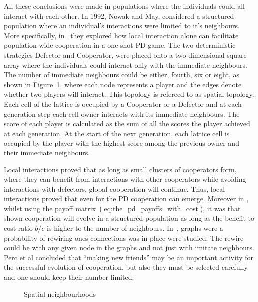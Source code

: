 \documentclass{article}
\theoremstyle{definition}
\begin{document}
All these conclusions were made in populations where the individuals could all
interact with each other. In 1992, Nowak and May, considered a structured population
where an individual's interactions were limited to it's neighbours.
More specifically, in~\cite{Nowak1992b} they explored how local interaction
alone can facilitate population wide cooperation in a one shot PD game. The two
deterministic strategies Defector and Cooperator, were placed onto a two
dimensional square array where the individuals could interact only with the
immediate neighbours. The number of immediate neighbours could be either,
fourth, six or eight, as shown in Figure~\ref{fig:topologies}, where each node
represents a player and the edges denote whether two players will interact. This
topology is refereed to as spatial topology. Each cell of the lattice is
occupied by a Cooperator or a Defector and at each generation step each cell owner
interacts with its immediate neighbours. The score of each player is calculated
as the sum of all the scores the player achieved at each generation. At the
start of the next generation, each lattice cell is occupied by the player with
the highest score among the previous owner and their immediate neighbours.

Local interactions proved that as long as small clusters of cooperators form, where
they can benefit from interactions with other cooperators while avoiding
interactions with defectors, global cooperation will continue. Thus, local
interactions proved that even for the PD cooperation can emerge. Moreover in
\cite{Ohtsuki2006}, whilst using the payoff
matrix~(\ref{eq:the_pd_payoffs_with_cost}), it was that shown cooperation will
evolve in a structured population as long as the benefit to cost ratio \(b / c\)
is higher to the number of neighbours. In~\cite{Perc2011}, graphs were a probability
of rewiring ones connections was in place were studied. The rewire could be with any
given node in the graphs and not just with imitate neighbours. Perc et al
concluded that ``making new friends'' may be an important activity for the
successful evolution of cooperation, but also they must be selected
carefully and one should keep their number limited.

\begin{figure}[!hbtp]
\centering
    \begin{subfigure}{.25\textwidth}
        
    \end{subfigure}
    \begin{subfigure}{.25\textwidth}\centering
        
     \end{subfigure}
     \begin{subfigure}{.25\textwidth}\centering
        
     \end{subfigure}
     \caption{Spatial neighbourhoods}\label{fig:topologies}
    \end{figure}
\end{document}
